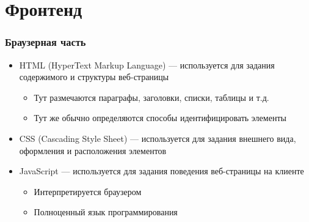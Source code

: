 \documentclass{../../slides-style}
\begin{document}
    \section{Фронтенд}

    \begin{frame}
        \frametitle{Браузерная часть}
        \begin{itemize}
            \item HTML (HyperText Markup Language) --- используется для задания содержимого и структуры веб-страницы
            \begin{itemize}
                \item Тут размечаются параграфы, заголовки, списки, таблицы и т.д.
                \item Тут же обычно определяются способы идентифицировать элементы
            \end{itemize}
            \item CSS (Cascading Style Sheet) --- используется для задания внешнего вида, оформления и расположения элементов
            \item JavaScript --- используется для задания поведения веб-страницы на клиенте
            \begin{itemize}
                \item Интерпретируется браузером
                \item Полноценный язык программирования
            \end{itemize}
        \end{itemize}
    \end{frame}
\end{document}
